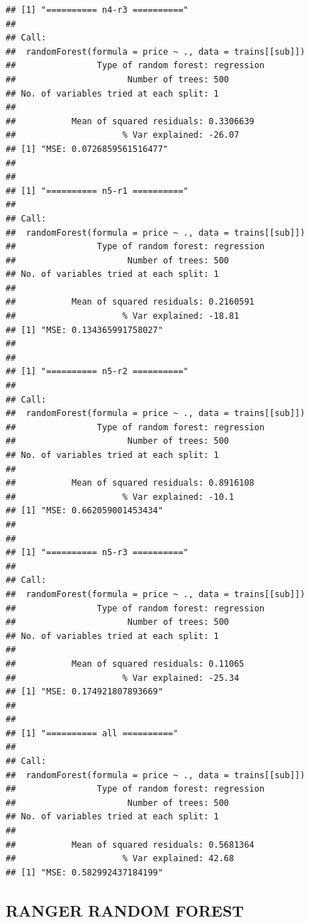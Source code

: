 \documentclass[
]{article}
\newenvironment{Shaded}{\begin{snugshade}}{\end{snugshade}}
\newcommand{\NormalTok}[1]{#1}
\newcommand{\OperatorTok}[1]{\textcolor[rgb]{0.81,0.36,0.00}{\textbf{#1}}}
\newcommand{\StringTok}[1]{\textcolor[rgb]{0.31,0.60,0.02}{#1}}
\begin{document}
\begin{verbatim}
## [1] "========== n4-r3 =========="
## 
## Call:
##  randomForest(formula = price ~ ., data = trains[[sub]]) 
##                Type of random forest: regression
##                      Number of trees: 500
## No. of variables tried at each split: 1
## 
##           Mean of squared residuals: 0.3306639
##                     % Var explained: -26.07
## [1] "MSE: 0.0726859561516477"
## 
## 
## [1] "========== n5-r1 =========="
## 
## Call:
##  randomForest(formula = price ~ ., data = trains[[sub]]) 
##                Type of random forest: regression
##                      Number of trees: 500
## No. of variables tried at each split: 1
## 
##           Mean of squared residuals: 0.2160591
##                     % Var explained: -18.81
## [1] "MSE: 0.134365991758027"
## 
## 
## [1] "========== n5-r2 =========="
## 
## Call:
##  randomForest(formula = price ~ ., data = trains[[sub]]) 
##                Type of random forest: regression
##                      Number of trees: 500
## No. of variables tried at each split: 1
## 
##           Mean of squared residuals: 0.8916108
##                     % Var explained: -10.1
## [1] "MSE: 0.662059001453434"
## 
## 
## [1] "========== n5-r3 =========="
## 
## Call:
##  randomForest(formula = price ~ ., data = trains[[sub]]) 
##                Type of random forest: regression
##                      Number of trees: 500
## No. of variables tried at each split: 1
## 
##           Mean of squared residuals: 0.11065
##                     % Var explained: -25.34
## [1] "MSE: 0.174921807893669"
## 
## 
## [1] "========== all =========="
## 
## Call:
##  randomForest(formula = price ~ ., data = trains[[sub]]) 
##                Type of random forest: regression
##                      Number of trees: 500
## No. of variables tried at each split: 1
## 
##           Mean of squared residuals: 0.5681364
##                     % Var explained: 42.68
## [1] "MSE: 0.582992437184199"
\end{verbatim}

\begin{Shaded}
\end{Shaded}

\hypertarget{ranger-random-forest}{%
\subsection{RANGER RANDOM FOREST}\label{ranger-random-forest}}
\end{document}
